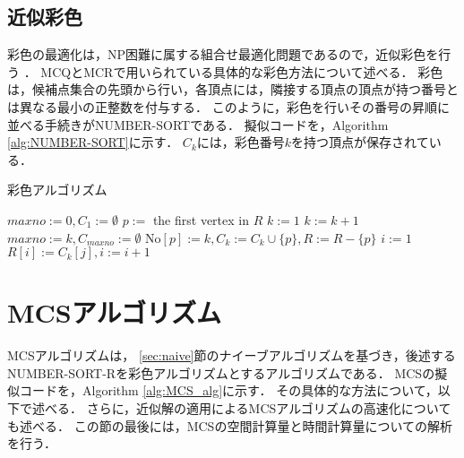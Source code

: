 \subsection{近似彩色}
彩色の最適化は，NP困難に属する組合せ最適化問題であるので，近似彩色を行う
．
MCQとMCRで用いられている具体的な彩色方法について述べる．
彩色は，候補点集合の先頭から行い，各頂点には，隣接する頂点の頂点が持つ番号とは異なる最小の正整数を付与する．
このように，彩色を行いその番号の昇順に並べる手続きがNUMBER-SORTである．
擬似コードを，Algorithm \ref{alg:NUMBER-SORT}に示す．
$C_k$には，彩色番号$k$を持つ頂点が保存されている．
\begin{algorithm}[p]
    \caption{彩色アルゴリズム}
    \label{alg:NUMBER-SORT}

    \begin{algorithmic}[1]
		\State $maxno:=0 , C_1 := \emptyset$
			\State $p:=$ the first vertex in $R$
			\State $k:=1$
				\State $k:=k+1$
			\EndWhile
				\State $ maxno := k , C_{maxno} := \emptyset$
			\EndIf
			\State $\mathrm{No}[p] := k , C_k := C_k \cup \{p \} , R := R - \{ p \}$
		\EndWhile
		\State $i:=1$
				\State $R[i] := C_k[j] , i := i+1 $
			\EndFor
		\EndFor
	\EndProcedure
    \end{algorithmic}
\end{algorithm}



\section{MCSアルゴリズム}
\label{sec:MCS}
MCSアルゴリズムは，
\ref{sec:naive}節のナイーブアルゴリズムを基づき，後述するNUMBER-SORT-Rを彩色アルゴリズムとするアルゴリズムである．
MCSの擬似コードを，Algorithm \ref{alg:MCS_alg}に示す．
その具体的な方法について，以下で述べる．
さらに，近似解の適用によるMCSアルゴリズムの高速化についても述べる．
この節の最後には，MCSの空間計算量と時間計算量についての解析を行う．


